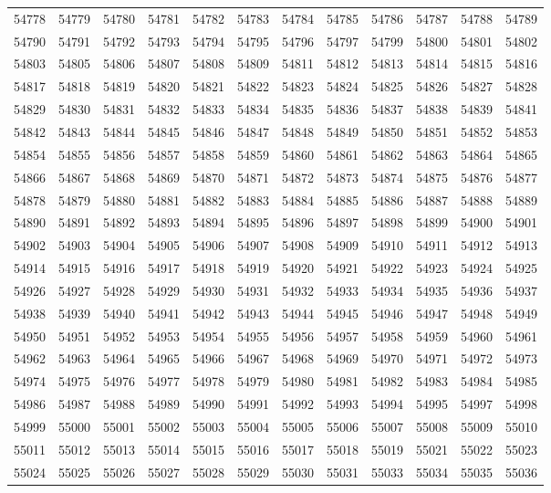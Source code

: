 \begin{center}
\begin{longtable}{llllllllllll}
54778 &54779 &54780 &54781 &54782 &54783 &54784 &54785 &54786 &54787 &54788 &54789 \\
54790 &54791 &54792 &54793 &54794 &54795 &54796 &54797 &54799 &54800 &54801 &54802 \\
54803 &54805 &54806 &54807 &54808 &54809 &54811 &54812 &54813 &54814 &54815 &54816 \\
54817 &54818 &54819 &54820 &54821 &54822 &54823 &54824 &54825 &54826 &54827 &54828 \\
54829 &54830 &54831 &54832 &54833 &54834 &54835 &54836 &54837 &54838 &54839 &54841 \\
54842 &54843 &54844 &54845 &54846 &54847 &54848 &54849 &54850 &54851 &54852 &54853 \\
54854 &54855 &54856 &54857 &54858 &54859 &54860 &54861 &54862 &54863 &54864 &54865 \\
54866 &54867 &54868 &54869 &54870 &54871 &54872 &54873 &54874 &54875 &54876 &54877 \\
54878 &54879 &54880 &54881 &54882 &54883 &54884 &54885 &54886 &54887 &54888 &54889 \\
54890 &54891 &54892 &54893 &54894 &54895 &54896 &54897 &54898 &54899 &54900 &54901 \\
54902 &54903 &54904 &54905 &54906 &54907 &54908 &54909 &54910 &54911 &54912 &54913 \\
54914 &54915 &54916 &54917 &54918 &54919 &54920 &54921 &54922 &54923 &54924 &54925 \\
54926 &54927 &54928 &54929 &54930 &54931 &54932 &54933 &54934 &54935 &54936 &54937 \\
54938 &54939 &54940 &54941 &54942 &54943 &54944 &54945 &54946 &54947 &54948 &54949 \\
54950 &54951 &54952 &54953 &54954 &54955 &54956 &54957 &54958 &54959 &54960 &54961 \\
54962 &54963 &54964 &54965 &54966 &54967 &54968 &54969 &54970 &54971 &54972 &54973 \\
54974 &54975 &54976 &54977 &54978 &54979 &54980 &54981 &54982 &54983 &54984 &54985 \\
54986 &54987 &54988 &54989 &54990 &54991 &54992 &54993 &54994 &54995 &54997 &54998 \\
54999 &55000 &55001 &55002 &55003 &55004 &55005 &55006 &55007 &55008 &55009 &55010 \\
55011 &55012 &55013 &55014 &55015 &55016 &55017 &55018 &55019 &55021 &55022 &55023 \\
55024 &55025 &55026 &55027 &55028 &55029 &55030 &55031 &55033 &55034 &55035 &55036 \\

\end{longtable}
\end{center}
